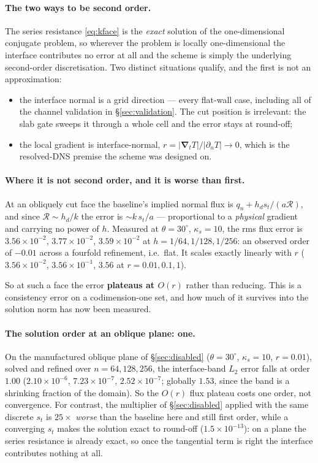 \documentclass[11pt,a4paper]{article}
\newcommand{\grad}{\boldsymbol{\nabla}}
\begin{document}
\paragraph{The two ways to be second order.}
The series resistance \eqref{eq:kface} is the \emph{exact} solution of the
one-dimensional conjugate problem, so wherever the problem is locally
one-dimensional the interface contributes no error at all and the scheme is
simply the underlying second-order discretisation. Two distinct situations
qualify, and the first is not an approximation:
\begin{itemize}
\item the interface normal is a grid direction --- every flat-wall case,
      including all of the channel validation in \S\ref{sec:validation}. The
      cut position is irrelevant: the slab gate sweeps it through a whole cell
      and the error stays at round-off;
\item the local gradient is interface-normal, $r = |\grad_t T|/|\partial_n T|
      \to 0$, which is the resolved-DNS premise the scheme was designed on.
\end{itemize}

\paragraph{Where it is not second order, and it is worse than first.}
At an obliquely cut face the baseline's implied normal flux is
$q_n + h_d s_t/(a\mathcal{R})$, and since $\mathcal{R}\sim h_d/k$ the error is
$\sim k\,s_t/a$ --- proportional to a \emph{physical} gradient and carrying no
power of $h$. Measured at $\theta=30^\circ$, $\kappa_s=10$, the rms flux error
is $3.56\times10^{-2}$, $3.77\times10^{-2}$, $3.59\times10^{-2}$ at
$h=1/64,1/128,1/256$: an observed order of $-0.01$ across a fourfold
refinement, i.e.\ flat. It scales exactly linearly with $r$
($3.56\times10^{-2}$, $3.56\times10^{-1}$, $3.56$ at $r=0.01,0.1,1$).

So at such a face the error \textbf{plateaus at $O(r)$} rather than reducing.
This is a consistency error on a codimension-one set, and how much of it
survives into the solution norm has now been measured.

\paragraph{The solution order at an oblique plane: \textbf{one}.}
On the manufactured oblique plane of \S\ref{sec:disabled} ($\theta=30^\circ$,
$\kappa_s=10$, $r=0.01$), solved and refined over $n=64,128,256$, the
interface-band $L_2$ error falls at order $\mathbf{1.00}$
($2.10\times10^{-6}$, $7.23\times10^{-7}$, $2.52\times10^{-7}$; globally
$1.53$, since the band is a shrinking fraction of the domain). So the $O(r)$
flux plateau costs one order, not convergence. For contrast, the multiplier of
\S\ref{sec:disabled} applied with the same discrete $s_t$ is $25\times$
\emph{worse} than the baseline here and still first order, while a converging
$s_t$ makes the solution exact to round-off ($1.5\times10^{-13}$): on a plane
the series resistance is already exact, so once the tangential term is right
the interface contributes nothing at all.
\end{document}
